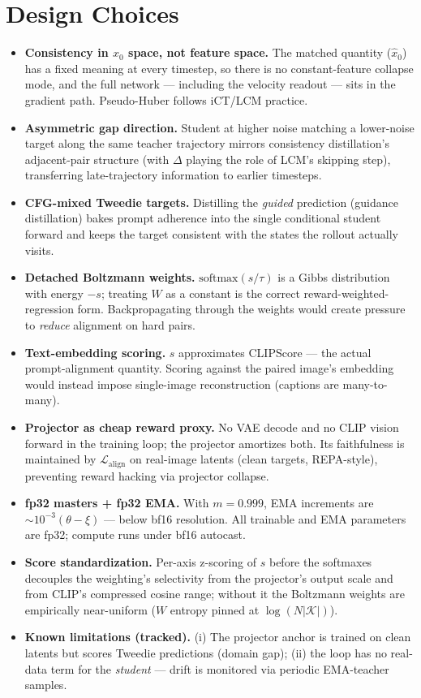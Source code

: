 \documentclass[10pt]{article}
\newcommand{\xhat}{\hat{x}_0}
\begin{document}
\section{Design Choices}

\begin{itemize}
\item \textbf{Consistency in $x_0$ space, not feature space.} The matched
quantity ($\xhat$) has a fixed meaning at every timestep, so there is no
constant-feature collapse mode, and the full network --- including the
velocity readout --- sits in the gradient path. Pseudo-Huber follows iCT/LCM
practice.
\item \textbf{Asymmetric gap direction.} Student at higher noise matching a
lower-noise target along the same teacher trajectory mirrors consistency
distillation's adjacent-pair structure (with $\Delta$ playing the role of
LCM's skipping step), transferring late-trajectory information to earlier
timesteps.
\item \textbf{CFG-mixed Tweedie targets.} Distilling the \emph{guided}
prediction (guidance distillation) bakes prompt adherence into the
single conditional student forward and keeps the target consistent with the
states the rollout actually visits.
\item \textbf{Detached Boltzmann weights.} $\mathrm{softmax}(s/\tau)$ is a
Gibbs distribution with energy $-s$; treating $W$ as a constant is the
correct reward-weighted-regression form. Backpropagating through the weights
would create pressure to \emph{reduce} alignment on hard pairs.
\item \textbf{Text-embedding scoring.} $s$ approximates CLIPScore --- the
actual prompt-alignment quantity. Scoring against the paired image's
embedding would instead impose single-image reconstruction (captions are
many-to-many).
\item \textbf{Projector as cheap reward proxy.} No VAE decode and no CLIP
vision forward in the training loop; the projector amortizes both. Its
faithfulness is maintained by $\mathcal{L}_{\mathrm{align}}$ on real-image
latents (clean targets, REPA-style), preventing reward hacking via projector
collapse.
\item \textbf{fp32 masters + fp32 EMA.} With $m = 0.999$, EMA increments are
$\sim\!10^{-3} (\theta - \xi)$ --- below bf16 resolution. All trainable and
EMA parameters are fp32; compute runs under bf16 autocast.
\item \textbf{Score standardization.} Per-axis z-scoring of $s$ before the
softmaxes decouples the weighting's selectivity from the projector's output
scale and from CLIP's compressed cosine range; without it the Boltzmann
weights are empirically near-uniform ($W$ entropy pinned at
$\log(N|\mathcal{K}|)$).
\item \textbf{Known limitations (tracked).} (i) The projector anchor is
trained on clean latents but scores Tweedie predictions (domain gap);
(ii) the loop has no real-data term for the \emph{student} --- drift is
monitored via periodic EMA-teacher samples.
\end{itemize}
\end{document}
